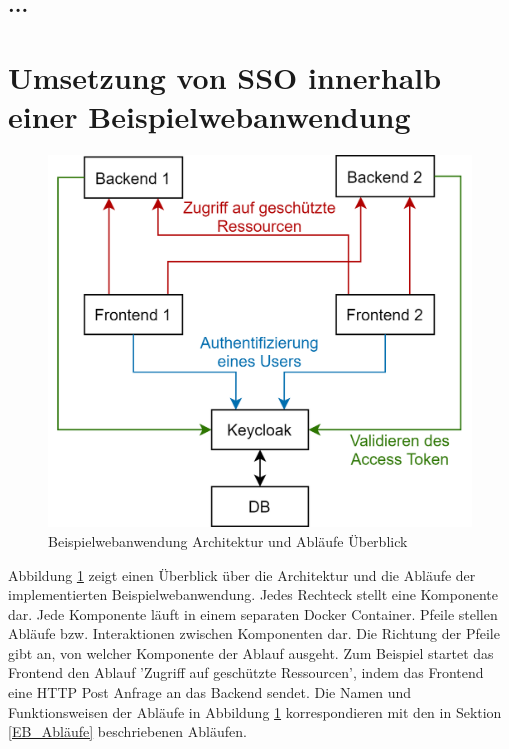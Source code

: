 \subsection{...}

\section{Umsetzung von SSO innerhalb einer Beispielwebanwendung}


\begin{figure}[!h]
	\centering
	\includegraphics[width=.8\textwidth]{Images/Ebert/ArchitectureDiagram.png}
	\caption{Beispielwebanwendung Architektur und Abläufe Überblick}
	\label{fig:EB_Beispielwebanwendung Architektur und Abläufe Überblick}
\end{figure}

Abbildung \ref{fig:EB_Beispielwebanwendung Architektur und Abläufe Überblick} zeigt einen Überblick über die Architektur und die Abläufe der implementierten Beispielwebanwendung. Jedes Rechteck stellt eine Komponente dar. Jede Komponente läuft in einem separaten Docker Container. Pfeile stellen Abläufe bzw. Interaktionen zwischen Komponenten dar. Die Richtung der Pfeile gibt an, von welcher Komponente der Ablauf ausgeht. Zum Beispiel startet das Frontend den Ablauf 'Zugriff auf geschützte Ressourcen', indem das Frontend eine HTTP Post Anfrage an das Backend sendet. Die Namen und Funktionsweisen der Abläufe in Abbildung \ref{fig:EB_Beispielwebanwendung Architektur und Abläufe Überblick} korrespondieren mit den in Sektion \ref{EB_Abläufe} beschriebenen Abläufen. 

